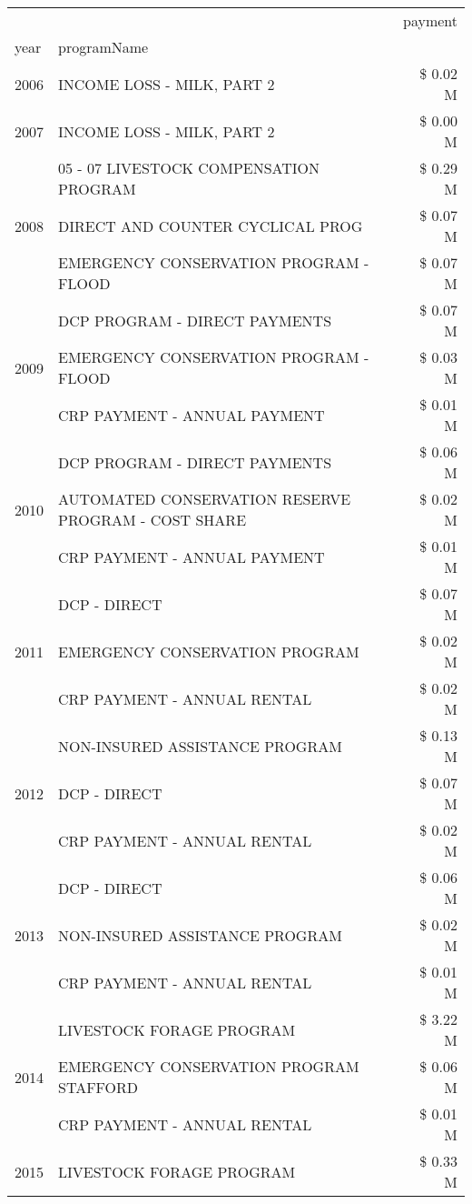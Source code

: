\begin{tabular}{llr}
\toprule
 &  & payment \\
year & programName &  \\
\midrule
2006 & INCOME LOSS - MILK, PART 2 & \$ 0.02 M \\
\cline{1-3}
2007 & INCOME LOSS - MILK, PART 2 & \$ 0.00 M \\
\cline{1-3}
\multirow[t]{3}{*}{2008} & 05 - 07 LIVESTOCK COMPENSATION PROGRAM & \$ 0.29 M \\
 & DIRECT AND COUNTER CYCLICAL PROG & \$ 0.07 M \\
 & EMERGENCY CONSERVATION PROGRAM - FLOOD & \$ 0.07 M \\
\cline{1-3}
\multirow[t]{3}{*}{2009} & DCP PROGRAM - DIRECT PAYMENTS & \$ 0.07 M \\
 & EMERGENCY CONSERVATION PROGRAM - FLOOD & \$ 0.03 M \\
 & CRP PAYMENT - ANNUAL PAYMENT & \$ 0.01 M \\
\cline{1-3}
\multirow[t]{3}{*}{2010} & DCP PROGRAM - DIRECT PAYMENTS & \$ 0.06 M \\
 & AUTOMATED CONSERVATION RESERVE PROGRAM - COST SHARE & \$ 0.02 M \\
 & CRP PAYMENT - ANNUAL PAYMENT & \$ 0.01 M \\
\cline{1-3}
\multirow[t]{3}{*}{2011} & DCP - DIRECT & \$ 0.07 M \\
 & EMERGENCY CONSERVATION PROGRAM & \$ 0.02 M \\
 & CRP PAYMENT - ANNUAL RENTAL & \$ 0.02 M \\
\cline{1-3}
\multirow[t]{3}{*}{2012} & NON-INSURED ASSISTANCE PROGRAM & \$ 0.13 M \\
 & DCP - DIRECT & \$ 0.07 M \\
 & CRP PAYMENT - ANNUAL RENTAL & \$ 0.02 M \\
\cline{1-3}
\multirow[t]{3}{*}{2013} & DCP - DIRECT & \$ 0.06 M \\
 & NON-INSURED ASSISTANCE PROGRAM & \$ 0.02 M \\
 & CRP PAYMENT - ANNUAL RENTAL & \$ 0.01 M \\
\cline{1-3}
\multirow[t]{3}{*}{2014} & LIVESTOCK FORAGE PROGRAM & \$ 3.22 M \\
 & EMERGENCY CONSERVATION PROGRAM STAFFORD & \$ 0.06 M \\
 & CRP PAYMENT - ANNUAL RENTAL & \$ 0.01 M \\
\cline{1-3}
\multirow[t]{3}{*}{2015} & LIVESTOCK FORAGE PROGRAM & \$ 0.33 M \\

\end{tabular}
